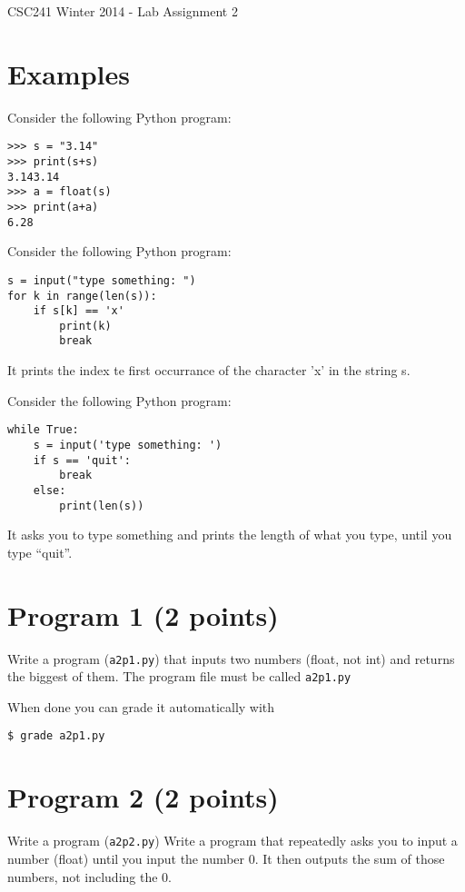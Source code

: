 \documentclass[12pt]{article}
\begin{document}
{\Large CSC241 Winter 2014 - Lab Assignment 2}

\section{Examples}

\noindent Consider the following Python program:
\begin{verbatim}
>>> s = "3.14"
>>> print(s+s)
3.143.14
>>> a = float(s)
>>> print(a+a)
6.28
\end{verbatim}

\noindent Consider the following Python program:
\begin{verbatim}
s = input("type something: ")
for k in range(len(s)):
    if s[k] == 'x'
        print(k)
        break
\end{verbatim}
\noindent It prints the index te first occurrance of the character 'x' in the string s.

\noindent Consider the following Python program:
\begin{verbatim}
while True:
    s = input('type something: ')
    if s == 'quit':
        break
    else:
        print(len(s))
\end{verbatim}
\noindent It asks you to type something and prints the length of what you type, until you type ``quit''.

\section{Program 1 (2 points)}

\noindent Write a program ({\tt a2p1.py})  
that inputs two numbers (float, not int) and                                                                              
returns the biggest of them.
The program file must be called {\tt a2p1.py}

\noindent When done you can grade it automatically with
\begin{verbatim}
$ grade a2p1.py
\end{verbatim}

\section{Program 2 (2 points)}

\noindent Write a program ({\tt a2p2.py}) 
Write a program that repeatedly asks you to input a number (float)                                                                        
until you input the number 0. It then outputs the sum of those numbers,                                                                   
not including the 0.
\end{document}
